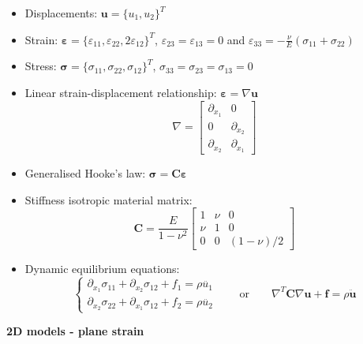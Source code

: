 \documentclass[12pt]{article}
\begin{document}
\begin{itemize}
      \item Displacements: $\mathbf u =\{u_{1}, u_{2}\}^T$
      \item Strain:  $\boldsymbol\varepsilon =\{\varepsilon_{11}, \varepsilon_{22}, 2\varepsilon_{12}\}^T$, $\varepsilon_{23}=\varepsilon_{13}=0$ and $\varepsilon_{33}=-\frac{\nu}{E}(\sigma_{11}+\sigma_{22})$
      \item Stress: $\boldsymbol\sigma =\{\sigma_{11}, \sigma_{22}, \sigma_{12}\}^T$, $\sigma_{33}=\sigma_{23}=\sigma_{13}=0$
      \item Linear strain-displacement relationship: $\boldsymbol\varepsilon=\nabla\mathbf u$
            $$\nabla=\begin{bmatrix} \partial_{x_1} & 0 \\ 0 & \partial_{x_2} \\ \partial_{x_2} & \partial_{x_1}  \end{bmatrix}$$
      \item Generalised Hooke’s law: $\boldsymbol\sigma=\mathbf C\boldsymbol\varepsilon$
      \item Stiffness isotropic material matrix:
            $$\mathbf C=\frac{E}{1-\nu^2}\begin{bmatrix} 1 & \nu & 0 \\ \nu & 1& 0 \\ 0 & 0 & (1-\nu)/2 \end{bmatrix}$$
      \item Dynamic equilibrium equations:
            $$ \begin{cases}
                        \partial_{x_1}\sigma_{11} + \partial_{x_2}\sigma_{12}  + f_1 = \rho \ddot{u_{1}} \\
                        \partial_{x_2}\sigma_{22} + \partial_{x_1}\sigma_{12}  + f_2 = \rho \ddot{u_{2}}
                  \end{cases}
                  \qquad \text{or}\qquad \nabla^T\mathbf C\nabla\mathbf u + \mathbf f = \rho \ddot{\mathbf u}$$
\end{itemize}

\newpage
\hrulefill
\vspace{0.3cm}

\hspace*{\fill}\textbf{\Large 2D models - plane strain}\hspace*{\fill}

\hrulefill
\end{document}

